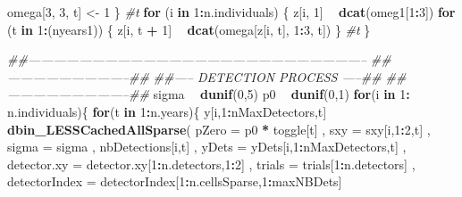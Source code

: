 \documentclass[
]{article}
\newenvironment{Shaded}{\begin{snugshade}}{\end{snugshade}}
\newcommand{\CommentTok}[1]{\textcolor[rgb]{0.56,0.35,0.01}{\textit{#1}}}
\newcommand{\ControlFlowTok}[1]{\textcolor[rgb]{0.13,0.29,0.53}{\textbf{#1}}}
\newcommand{\DataTypeTok}[1]{\textcolor[rgb]{0.13,0.29,0.53}{#1}}
\newcommand{\DecValTok}[1]{\textcolor[rgb]{0.00,0.00,0.81}{#1}}
\newcommand{\KeywordTok}[1]{\textcolor[rgb]{0.13,0.29,0.53}{\textbf{#1}}}
\newcommand{\NormalTok}[1]{#1}
\newcommand{\OperatorTok}[1]{\textcolor[rgb]{0.81,0.36,0.00}{\textbf{#1}}}
\newcommand{\StringTok}[1]{\textcolor[rgb]{0.31,0.60,0.02}{#1}}
\begin{document}
\begin{Shaded}
\begin{Highlighting}[]
\NormalTok{    omega[}\DecValTok{3}\NormalTok{, }\DecValTok{3}\NormalTok{, t] <-}\StringTok{ }\DecValTok{1}
\NormalTok{  \} }\CommentTok{#t}
  \ControlFlowTok{for}\NormalTok{ (i }\ControlFlowTok{in} \DecValTok{1}\OperatorTok{:}\NormalTok{n.individuals) \{}
\NormalTok{    z[i, }\DecValTok{1}\NormalTok{] }\OperatorTok{~}\StringTok{ }\KeywordTok{dcat}\NormalTok{(omeg1[}\DecValTok{1}\OperatorTok{:}\DecValTok{3}\NormalTok{])}
    \ControlFlowTok{for}\NormalTok{ (t }\ControlFlowTok{in} \DecValTok{1}\OperatorTok{:}\NormalTok{(nyears1)) \{}
\NormalTok{      z[i, t }\OperatorTok{+}\StringTok{ }\DecValTok{1}\NormalTok{] }\OperatorTok{~}\StringTok{ }\KeywordTok{dcat}\NormalTok{(omega[z[i, t], }\DecValTok{1}\OperatorTok{:}\DecValTok{3}\NormalTok{, t])}
\NormalTok{    \} }\CommentTok{#t}
\NormalTok{  \}}
  
  \CommentTok{##--------------------------------------------------------------------------------   }
  \CommentTok{##-----------------------------##}
  \CommentTok{##----- DETECTION PROCESS -----## }
  \CommentTok{##-----------------------------## }
\NormalTok{  sigma }\OperatorTok{~}\StringTok{ }\KeywordTok{dunif}\NormalTok{(}\DecValTok{0}\NormalTok{,}\DecValTok{5}\NormalTok{)}
\NormalTok{  p0 }\OperatorTok{~}\StringTok{ }\KeywordTok{dunif}\NormalTok{(}\DecValTok{0}\NormalTok{,}\DecValTok{1}\NormalTok{)}
  \ControlFlowTok{for}\NormalTok{(i }\ControlFlowTok{in} \DecValTok{1}\OperatorTok{:}\StringTok{ }\NormalTok{n.individuals)\{}
    \ControlFlowTok{for}\NormalTok{(t }\ControlFlowTok{in} \DecValTok{1}\OperatorTok{:}\NormalTok{n.years)\{}
\NormalTok{      y[i,}\DecValTok{1}\OperatorTok{:}\NormalTok{nMaxDetectors,t] }\OperatorTok{~}\StringTok{ }\KeywordTok{dbin_LESSCachedAllSparse}\NormalTok{(}
             \DataTypeTok{pZero =}\NormalTok{ p0 }\OperatorTok{*}\StringTok{ }\NormalTok{toggle[t]}
\NormalTok{            , }\DataTypeTok{sxy =}\NormalTok{ sxy[i,}\DecValTok{1}\OperatorTok{:}\DecValTok{2}\NormalTok{,t]}
\NormalTok{            , }\DataTypeTok{sigma =}\NormalTok{ sigma}
\NormalTok{            , nbDetections[i,t]}
\NormalTok{            , }\DataTypeTok{yDets =}\NormalTok{ yDets[i,}\DecValTok{1}\OperatorTok{:}\NormalTok{nMaxDetectors,t]}
\NormalTok{            , }\DataTypeTok{detector.xy =}\NormalTok{  detector.xy[}\DecValTok{1}\OperatorTok{:}\NormalTok{n.detectors,}\DecValTok{1}\OperatorTok{:}\DecValTok{2}\NormalTok{]}
\NormalTok{            , }\DataTypeTok{trials =}\NormalTok{ trials[}\DecValTok{1}\OperatorTok{:}\NormalTok{n.detectors]}
\NormalTok{            , }\DataTypeTok{detectorIndex =}\NormalTok{ detectorIndex[}\DecValTok{1}\OperatorTok{:}\NormalTok{n.cellsSparse,}\DecValTok{1}\OperatorTok{:}\NormalTok{maxNBDets]}

\end{Highlighting}
\end{Shaded}
\end{document}
